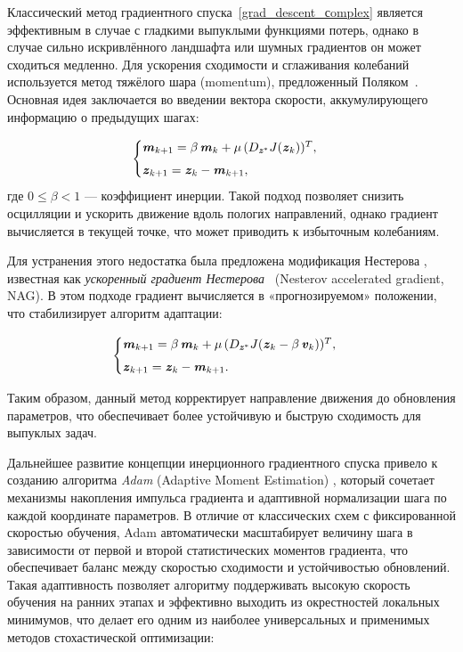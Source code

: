 Классический метод градиентного спуска~\eqref{grad_descent_сomplex} является эффективным в случае с гладкими выпуклыми функциями потерь, однако в случае сильно искривлённого ландшафта или шумных градиентов он может сходиться медленно. Для ускорения сходимости и сглаживания колебаний используется метод тяжёлого шара (momentum), предложенный Поляком~\cite{polyak1964}. Основная идея заключается во введении вектора скорости, аккумулирующего информацию о предыдущих шагах:

\begin{equation}
	\begin{cases}
		\textbf{\textit{m}}_{k+1} = \beta\,\textbf{\textit{m}}_k + \mu\,(D_{\textbf{\textit{z}}^*}J(\textbf{\textit{z}}_k))^T,\\[4pt]
		\textbf{\textit{z}}_{k+1} = \textbf{\textit{z}}_k - \textbf{\textit{m}}_{k+1},
	\end{cases}
	\label{eq:momentum}
\end{equation}
где \(0 \le \beta < 1\) — коэффициент инерции. Такой подход позволяет снизить осцилляции и ускорить движение вдоль пологих направлений, однако градиент вычисляется в текущей точке, что может приводить к избыточным колебаниям.

Для устранения этого недостатка была предложена модификация Нестерова , известная как \textit{ускоренный градиент Нестерова}~\cite{nesterov1983method} (Nesterov accelerated gradient, NAG). В этом подходе градиент вычисляется в «прогнозируемом» положении, что стабилизирует алгоритм адаптации:

\begin{equation}
	\begin{cases}
		\textbf{\textit{m}}_{k+1} = \beta\,\textbf{\textit{m}}_k + \mu\,(D_{\textbf{\textit{z}}^*}J(\textbf{\textit{z}}_k - \beta\,\textbf{\textit{v}}_k))^T,\\[4pt]
		\textbf{\textit{z}}_{k+1} = \textbf{\textit{z}}_k - \textbf{\textit{m}}_{k+1}.
	\end{cases}
	\label{eq:nesterov}
\end{equation}

Таким образом, данный метод корректирует направление движения до обновления параметров, что обеспечивает более устойчивую и быструю сходимость для выпуклых задач.

Дальнейшее развитие концепции инерционного градиентного спуска привело к созданию алгоритма \textit{Adam} (Adaptive Moment Estimation) \cite{kingma2014adam}, который сочетает механизмы накопления импульса градиента и адаптивной нормализации шага по каждой координате параметров. В отличие от классических схем с фиксированной скоростью обучения, Adam автоматически масштабирует величину шага в зависимости от первой и второй статистических моментов градиента, что обеспечивает баланс между скоростью сходимости и устойчивостью обновлений. Такая адаптивность позволяет алгоритму поддерживать высокую скорость обучения на ранних этапах и эффективно выходить из окрестностей локальных минимумов, что делает его одним из наиболее универсальных и применимых методов стохастической оптимизации:

